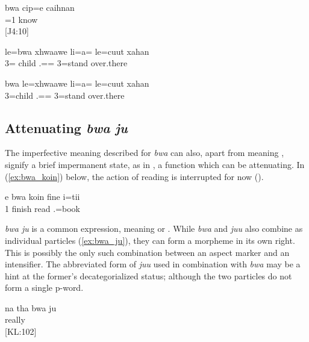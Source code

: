 \ea\label{ex:bwa_cipe} 
\gll bwa cip=e caihnan\\
  =1 know\\
\glt {} {[J4:10]}
\z


\ea\label{ex:pn-asp-nomp}
\gll  le=bwa xhwaawe li=a= le=cuut xahan	\\
 3= child .== 3=stand over.there	\\
\glt {}	
\z

\ea\label{ex:asp-nomp}
\gll  *bwa le=xhwaawe li=a= le=cuut xahan	\\
  3=child .== 3=stand over.there	\\
\z 

\subsection{Attenuating \textit{bwa ju}}
\label{ssec:bwa_ju} 
The imperfective meaning described for \textit{bwa} can also, apart from meaning , signify a brief impermanent state, as in , a function which can be attenuating. In (\ref{ex:bwa_koin}) below, the action of reading is interrupted for now ().

\ea \label{ex:bwa_koin}
\gll 	e bwa koin fine i=tii	\\
	1  finish read .=book	\\
\glt	{}%
\z 

\textit{bwa ju}  is a common expression, meaning  or . While \textit{bwa} and \textit{juu} also combine as individual particles (\ref{ex:bwa_ju}), they can form a morpheme in its own right. This is possibly the only such combination between an aspect marker and an intensifier. The abbreviated form of \textit{juu} used in combination with \textit{bwa} may be a hint at the former's decategorialized status; although the two particles do not form a single p-word. %

\ea \label{ex:bwa_ju} 
\gll na tha bwa ju\\
    really\\
\glt {} {[KL:102]}
\z


